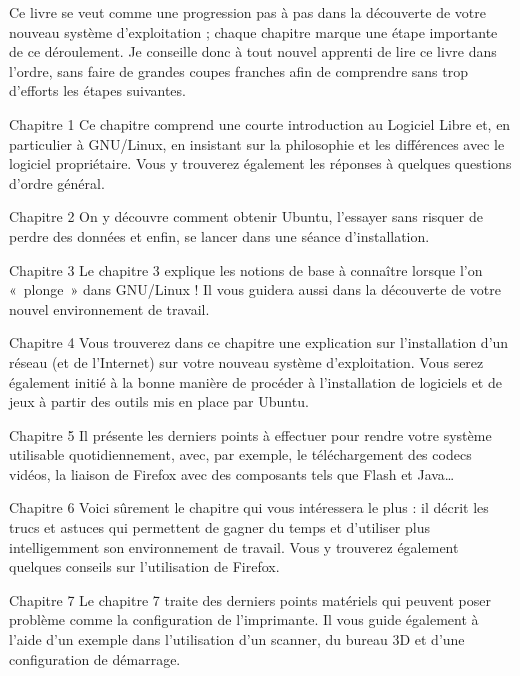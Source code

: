 
Ce livre se veut comme une progression pas à pas dans la découverte de votre nouveau système d'exploitation ; chaque chapitre marque une étape importante de ce déroulement. Je conseille donc à tout nouvel apprenti de lire ce livre dans l'ordre, sans faire de grandes coupes franches afin de comprendre sans trop d'efforts les étapes suivantes.\par
\begin{DescriptionChapitres}
\item [Chapitre 1] Ce chapitre comprend une courte introduction au Logiciel Libre et, en particulier à GNU/Linux, en insistant sur la philosophie et les différences avec le logiciel propriétaire. Vous y trouverez également les réponses à quelques questions d'ordre général.
\item [Chapitre 2] On y découvre comment obtenir Ubuntu, l'essayer sans risquer de perdre des données et enfin, se lancer dans une séance d'installation.
\item [Chapitre 3] Le chapitre 3 explique les notions de base à connaître lorsque l'on «~plonge~» dans GNU/Linux ! Il vous guidera aussi dans la découverte de votre nouvel environnement de travail.
\item [Chapitre 4] Vous trouverez dans ce chapitre une explication sur l'installation d'un réseau (et de l'Internet) sur votre nouveau système d'exploitation. Vous serez également initié à la bonne manière de procéder à l'installation de logiciels et de jeux à partir des outils mis en place par Ubuntu.
\item [Chapitre 5] Il présente les derniers points à effectuer pour rendre votre système utilisable quotidiennement, avec, par exemple, le téléchargement des codecs vidéos, la liaison de Firefox avec des composants tels que Flash et Java\ldots{}
\item [Chapitre 6] Voici sûrement le chapitre qui vous intéressera le plus : il décrit les trucs et astuces qui permettent de gagner du temps et d'utiliser plus intelligemment son environnement de travail. Vous y trouverez également quelques conseils sur l'utilisation de Firefox.
\item [Chapitre 7] Le chapitre 7 traite des derniers points matériels qui peuvent poser problème comme la configuration de l'imprimante. Il vous guide également à l'aide d'un exemple dans l'utilisation d'un scanner, du bureau 3D et d'une configuration de démarrage.

\end{DescriptionChapitres}
